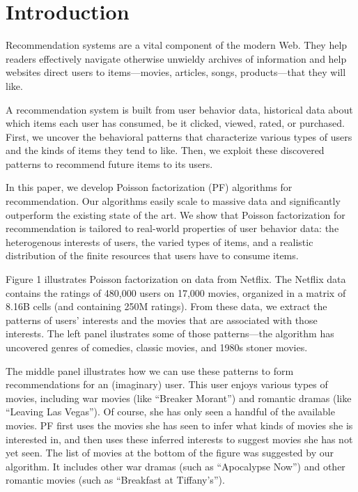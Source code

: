 \section{Introduction}

Recommendation systems are a vital component of the modern Web.  They
help readers effectively navigate otherwise unwieldy archives of
information and help websites direct users to items---movies,
articles, songs, products---that they will like.

A recommendation system is built from user behavior data, historical
data about which items each user has consumed, be it clicked, viewed,
rated, or purchased. First, we uncover the behavioral patterns that
characterize various types of users and the kinds of items they tend
to like.  Then, we exploit these discovered patterns to recommend
future items to its users.

In this paper, we develop Poisson factorization (PF) algorithms for
recommendation.  Our algorithms easily scale to massive data and
significantly outperform the existing state of the art.  We show that
Poisson factorization for recommendation is tailored to real-world
properties of user behavior data: the heterogenous interests of users,
the varied types of items, and a realistic distribution of the finite
resources that users have to consume items.

Figure 1 illustrates Poisson factorization on data from Netflix.  The
Netflix data contains the ratings of 480,000 users on 17,000 movies,
organized in a matrix of 8.16B cells (and containing 250M ratings).
From these data, we extract the patterns of users' interests and the
movies that are associated with those interests.  The left panel
ilustrates some of those patterns---the algorithm has uncovered genres
of comedies, classic movies, and 1980s stoner movies.

The middle panel illustrates how we can use these patterns to form
recommendations for an (imaginary) user.  This user enjoys various
types of movies, including war movies (like ``Breaker Morant'') and
romantic dramas (like ``Leaving Las Vegas'').  Of course, she has only
seen a handful of the available movies.  PF first uses the movies she
has seen to infer what kinds of movies she is interested in, and then
uses these inferred interests to suggest movies she has not yet seen.
The list of movies at the bottom of the figure was suggested by our
algorithm. It includes other war dramas (such as ``Apocalypse Now'')
and other romantic movies (such as ``Breakfast at Tiffany's'').

